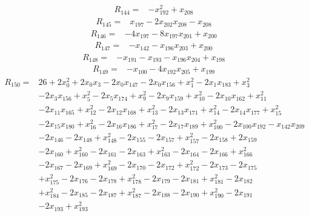 \[
\begin{aligned}
R_{144}={}&-x_{192}^{2}+x_{208}
\end{aligned}
\]
\[
\begin{aligned}
R_{145}={}&x_{197}-2x_{202}x_{208}-x_{208}
\end{aligned}
\]
\[
\begin{aligned}
R_{146}={}&-4x_{197}-8x_{197}x_{201}+x_{200}
\end{aligned}
\]
\[
\begin{aligned}
R_{147}={}&-x_{142}-x_{196}x_{203}+x_{200}
\end{aligned}
\]
\[
\begin{aligned}
R_{148}={}&-x_{191}-x_{193}-x_{196}x_{204}+x_{198}
\end{aligned}
\]
\[
\begin{aligned}
R_{149}={}&-x_{100}-4x_{192}x_{205}+x_{199}
\end{aligned}
\]
\[
\begin{aligned}
R_{150}={}&26+2x_{0}^{2}+2x_{0}x_{3}-2x_{0}x_{147}-2x_{0}x_{156}+x_{1}^{2}-2x_{1}x_{183}+x_{3}^{2}\\
&-2x_{3}x_{156}+x_{5}^{2}-2x_{5}x_{174}+x_{9}^{2}-2x_{9}x_{159}+x_{10}^{2}-2x_{10}x_{162}+x_{11}^{2}\\
&-2x_{11}x_{165}+x_{12}^{2}-2x_{12}x_{168}+x_{13}^{2}-2x_{13}x_{171}+x_{14}^{2}-2x_{14}x_{177}+x_{15}^{2}\\
&-2x_{15}x_{180}+x_{16}^{2}-2x_{16}x_{186}+x_{17}^{2}-2x_{17}x_{189}+x_{100}^{2}-2x_{100}x_{192}-x_{142}x_{209}\\
&-2x_{146}-2x_{148}+x_{148}^{2}-2x_{155}-2x_{157}+x_{157}^{2}-2x_{158}+2x_{159}\\
&-2x_{160}+x_{160}^{2}-2x_{161}-2x_{163}+x_{163}^{2}-2x_{164}-2x_{166}+x_{166}^{2}\\
&-2x_{167}-2x_{169}+x_{169}^{2}-2x_{170}-2x_{172}+x_{172}^{2}-2x_{173}-2x_{175}\\
&+x_{175}^{2}-2x_{176}-2x_{178}+x_{178}^{2}-2x_{179}-2x_{181}+x_{181}^{2}-2x_{182}\\
&+x_{184}^{2}-2x_{185}-2x_{187}+x_{187}^{2}-2x_{188}-2x_{190}+x_{190}^{2}-2x_{191}\\
&-2x_{193}+x_{193}^{2}
\end{aligned}
\]
